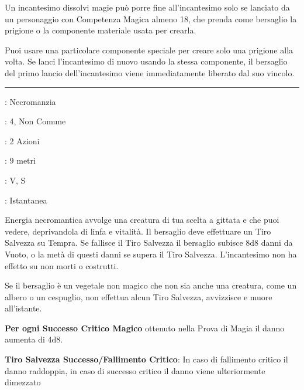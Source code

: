 \begin{multicols}{2}
Un incantesimo dissolvi magie può porre fine all'incantesimo solo se lanciato da un personaggio con Competenza Magica almeno 18, che prenda come bersaglio la prigione o la componente materiale usata per crearla.

Puoi usare una particolare componente speciale per creare solo una prigione alla volta. Se lanci l'incantesimo di nuovo usando la stessa componente, il bersaglio del primo lancio dell'incantesimo viene immediatamente liberato dal suo vincolo.

\smallskip\noindent\rule{\linewidth}{2pt} \hypertarget{Inaridire}{}\medskip{}
\noindent
\begin{description}[noitemsep, topsep=0pt, parsep=0pt, partopsep=0pt, leftmargin=0cm, labelwidth=2.8cm]
	\item[\textbf{Lista di Magia}]: Necromanzia
	\item[\textbf{Livello}]: 4, Non Comune
	\item[\textbf{T. di Lancio}]: 2 Azioni
	\item[\textbf{Gittata}]: 9 metri
	\item[\textbf{Componenti}]: V, S
	\item[\textbf{Durata}]: Istantanea
\end{description}

Energia necromantica avvolge una creatura di tua scelta a gittata e che puoi vedere, deprivandola di linfa e vitalità. Il bersaglio deve effettuare un Tiro Salvezza su Tempra. Se fallisce il Tiro Salvezza il bersaglio subisce 8d8 danni da Vuoto, o la metà di questi danni se supera il Tiro Salvezza. L'incantesimo non ha effetto su non morti o costrutti.

Se il bersaglio è un vegetale non magico che non sia anche una creatura, come un albero o un cespuglio, non effettua alcun Tiro Salvezza, avvizzisce e muore all'istante.

\textbf{Per ogni Successo Critico Magico} ottenuto nella Prova di Magia il danno aumenta di 4d8.

\textbf{Tiro Salvezza Successo/Fallimento Critico}: In caso di fallimento critico il danno raddoppia, in caso di successo critico il danno viene ulteriormente dimezzato


\end{multicols}
